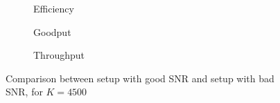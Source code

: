 \begin{figure}[!h]
\centering
\begin{subfigure}{0.23\textwidth}
	\captionsetup{justification=centering,font=scriptsize}
	\centering
	\setlength\fwidth{\textwidth}
	\setlength{}
	
	\caption{Efficiency}
	\label{fig:wifi_eff_lsnr_4500}
\end{subfigure}\hspace{2em}%
\begin{subfigure}{0.23\textwidth}
	\captionsetup{justification=centering,font=scriptsize}
	\centering
	\setlength\fwidth{\textwidth}
	\setlength{}
	
	\caption{Goodput}
	\label{fig:wifi_good_lsnr_4500}
\end{subfigure}\hspace{2em}%
\begin{subfigure}{0.23\textwidth}
	\captionsetup{justification=centering,font=scriptsize}
	\centering
	\setlength\fwidth{\textwidth}
	\setlength{}
	
	\caption{Throughput}
	\label{fig:wifi_thr_lsnr_4500}
\end{subfigure}
\caption{Comparison between setup with good SNR and setup with bad SNR, for $K=4500$}
\label{fig:wifi_lsnr_4500}
\end{figure}


